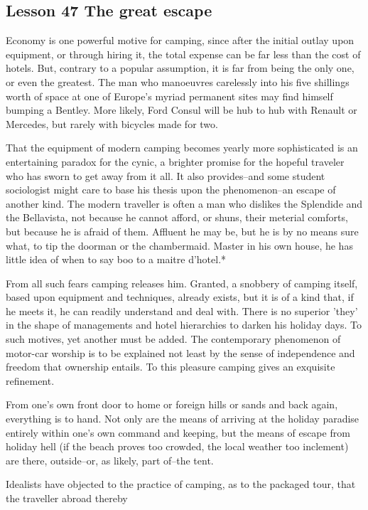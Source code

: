 \documentclass[kindlepaper]{BHCexam4kindle}
\begin{document}
\subsection{Lesson 47
The great escape}
\par
Economy is one powerful motive for camping, since after the initial outlay upon equipment, or through hiring
it, the total expense can be far less than the cost of hotels. But, contrary to a popular assumption, it is far from
being the only one, or even the greatest. The man who manoeuvres carelessly into his five shillings worth of
space at one of Europe's myriad permanent sites may find himself bumping a Bentley. More likely, Ford
Consul will be hub to hub with Renault or Mercedes, but rarely with bicycles made for two.
\par
That the equipment of modern camping becomes yearly more sophisticated is an entertaining paradox for the
cynic, a brighter promise for the hopeful traveler who has sworn to get away from it all. It also provides--and
some student sociologist might care to base his thesis upon the phenomenon--an escape of another kind. The
modern traveller is often a man who dislikes the Splendide and the Bellavista, not because he cannot afford, or
shuns, their meterial comforts, but because he is afraid of them. Affluent he may be, but he is by no means sure
what, to tip the doorman or the chambermaid. Master in his own house, he has little idea of when to say boo to
a maitre d'hotel.*
\par
From all such fears camping releases him. Granted, a snobbery of camping itself, based upon equipment and
techniques, already exists, but it is of a kind that, if he meets it, he can readily understand and deal with. There
is no superior 'they' in the shape of managements and hotel hierarchies to darken his holiday days.
To such motives, yet another must be added. The contemporary phenomenon of motor-car worship is to be
explained not least by the sense of independence and freedom that ownership entails. To this pleasure camping
gives an exquisite refinement.
\par
From one's own front door to home or foreign hills or sands and back again, everything is to hand. Not only
are the means of arriving at the holiday paradise entirely within one's own command and keeping, but the
means of escape from holiday hell (if the beach proves too crowded, the local weather too inclement) are there,
outside--or, as likely, part of--the tent.
\par
Idealists have objected to the practice of camping, as to the packaged tour, that the traveller abroad thereby
\end{document}
